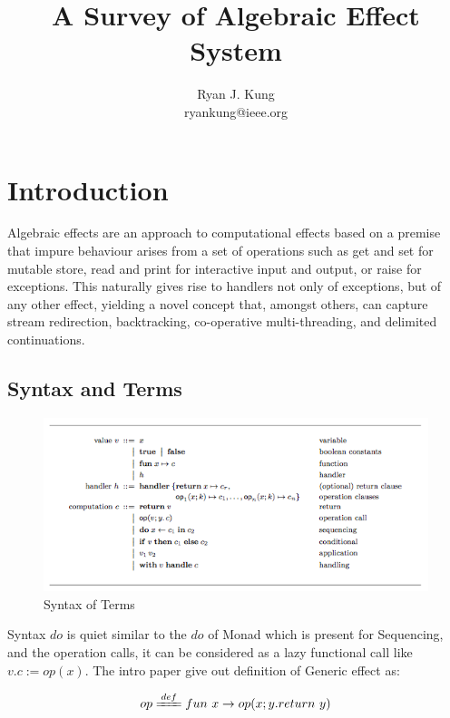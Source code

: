 \documentclass{article}
\author{Ryan J. Kung \\ryankung@ieee.org\\}
\title{A Survey of Algebraic Effect System}
\begin{document}
\maketitle

\section{Introduction}

Algebraic eﬀects are an approach to computational eﬀects based on a premise that impure behaviour arises from a set of operations such as get and set for mutable store, read and print for interactive input and output, or raise for exceptions. This naturally gives rise to handlers not only of exceptions, but of any other eﬀect, yielding a novel concept that, amongst others, can capture stream redirection, backtracking, co-operative multi-threading, and delimited continuations\cite{intro-algebraic-effects-and-handlers}.

\subsection{Syntax and Terms}
\begin{figure}[H]
  \centering
  \includegraphics[width=1\linewidth]{src/syntax.png}
  \caption{Syntax of Terms \cite{intro-algebraic-effects-and-handlers}}
\end{figure}

Syntax $do$ is quiet similar to the $do$ of Monad which is present for Sequencing, and the operation calls, it can be considered as a lazy functional call like $v.c := op(x)$. The intro paper\cite{intro-algebraic-effects-and-handlers} give out definition of Generic effect as:

\begin{gather}
  op \xlongequal[]{def} fun\ x \rightarrow op(x; y.return\ y)
\end{gather}
\end{document}
